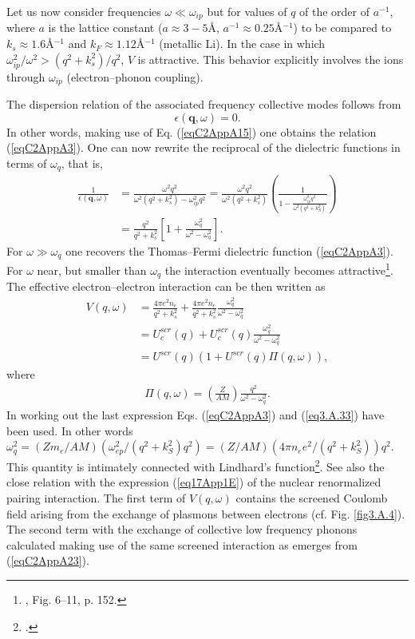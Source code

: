 \begin{subappendices}
Let us now consider frequencies $\omega\ll \omega_{ip}$ but for values of $q$ of the order of $a^{-1}$, where $a$ is the lattice constant ($a\approx 3-5$\AA, $a^{-1}\approx 0.25$\AA$^{-1}$) to be compared to $k_s\approx 1.6 $\AA$^{-1}$ and $k_F\approx 1.12$\AA$^{-1}$ (metallic Li). In the case in which $\omega_{ip}^2/\omega^2>(q^2+k_s^2)/q^2$, $V$ is attractive.  This behavior explicitly involves the ions through $\omega_{ip}$ (electron--phonon coupling). 


The dispersion relation of the associated frequency collective modes follows from
\begin{equation}\label{eqC2AppA21}
\epsilon(\mathbf q,\omega)=0.
\end{equation}
In other words, making use of Eq. (\ref{eqC2AppA15}) one obtains the relation (\ref{eqC2AppA3}). One can now rewrite the reciprocal of the dielectric functions in terms of $\omega_{q}$, that is,
\begin{align}\label{eqC2AppA22}
\nonumber \frac{1}{\epsilon(\mathbf q,\omega)}&=\frac{\omega^2q^2}{\omega^2(q^2+k_s^2)-\omega_{ip}^2q^2}=\frac{\omega^2q^2}{\omega^2(q^2+k_s^2)}\left(\frac{1}{1-\frac{\omega^2_{ip}q^2}{\omega^2(q^2+k_S^2)}}\right)\\
&=\frac{q^2}{q^2+k_s^2}\left[1+\frac{\omega_q^2}{\omega^2-\omega_q^2}\right].
\end{align}
For $\omega\gg \omega_q$ one recovers the Thomas--Fermi dielectric function (\ref{eqC2AppA3}). For $\omega$ near, but smaller than $\omega_q$ the interaction eventually becomes   attractive\footnote{\cite{Schrieffer:64}, Fig. 6--11, p. 152.}. The effective electron--electron interaction can be then written as
\begin{align}\label{eqC2AppA23}
\nonumber V(q,\omega)&=\frac{4\pi  e^2n_e}{q^2+k_s^2}+\frac{4\pi  e^2n_e}{q^2+k_s^2}\frac{\omega_q^2}{\omega^2-\omega_q^2}\\
\nonumber &=U^{scr}_c(q)+U_c^{scr}(q)\frac{\omega_q^2}{\omega^2-\omega_q^2}\\
&=U^{scr}(q)\left(1+U^{scr}(q)\Pi(q,\omega)\right),
\end{align}
where
\begin{align}\label{eqC2AppA24}
\Pi(q,\omega)=\left(\frac{Z}{AM}\right)\frac{q^2}{\omega^2-\omega_q^2}.
\end{align}
In working out the last expression Eqs. (\ref{eqC2AppA3}) and (\ref{eq3.A.33}) have been used. In other words $\omega_q^2=(Zm_e/AM)(\omega^2_{ep}/(q^2+k_S^2)q^2)=(Z/AM)(4\pi n_ee^2/(q^2+k_S^2))q^2$.
This quantity
is intimately connected with Lindhard's function\footnote{\cite{Lindhard:53}.}. See also the close relation with the expression (\ref{eq17App1E}) of the nuclear renormalized pairing interaction. The first term of $V(q,\omega)$ contains the screened Coulomb field arising from the exchange of plasmons between electrons (cf. Fig. \ref{fig3.A.4}). The second term with the exchange of collective low frequency phonons calculated making use of the same screened interaction as emerges from (\ref{eqC2AppA23}). 



\end{subappendices}
